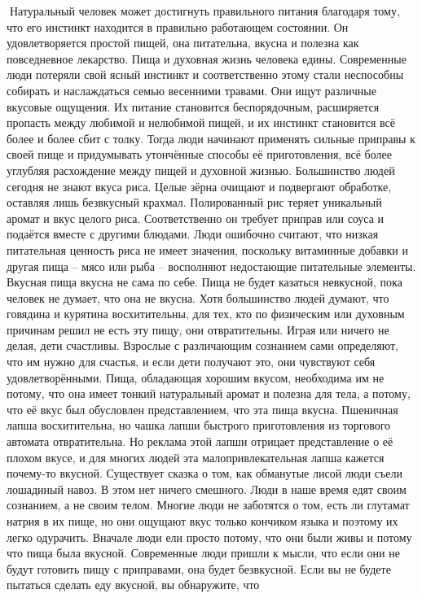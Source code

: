 \documentclass[a4paper]{book}
\begin{document}
Натуральный человек может достигнуть правильного питания благодаря тому, что его
инстинкт находится в правильно работающем состоянии. Он удовлетворяется простой
пищей, она питательна, вкусна и полезна как повседневное лекарство. Пища и духовная
жизнь человека едины.
Современные люди потеряли свой ясный инстинкт и соответственно этому стали
неспособны собирать и наслаждаться семью весенними травами. Они ищут различные
вкусовые ощущения. Их питание становится беспорядочным, расширяется пропасть между
любимой и нелюбимой пищей, и их инстинкт становится всё более и более сбит с толку.
Тогда люди начинают применять сильные приправы к своей пище и придумывать
утончённые способы её приготовления, всё более углубляя расхождение между пищей и
духовной жизнью.
Большинство людей сегодня не знают вкуса риса. Целые зёрна очищают и подвергают
обработке, оставляя лишь безвкусный крахмал. Полированный рис теряет уникальный
аромат и вкус целого риса. Соответственно он требует приправ или соуса и подаётся вместе с
другими блюдами. Люди ошибочно считают, что низкая питательная ценность риса не имеет
значения, поскольку витаминные добавки и другая пища – мясо или рыба – восполняют
недостающие питательные элементы. Вкусная пища вкусна не сама по себе. Пища не будет
казаться невкусной, пока человек не думает, что она не вкусна. Хотя большинство людей
думают, что говядина и курятина восхитительны, для тех, кто по физическим или духовным
причинам решил не есть эту пищу, они отвратительны.
Играя или ничего не делая, дети счастливы. Взрослые с различающим сознанием сами
определяют, что им нужно для счастья, и если дети получают это, они чувствуют себя
удовлетворёнными. Пища, обладающая хорошим вкусом, необходима им не потому, что она
имеет тонкий натуральный аромат и полезна для тела, а потому, что её вкус был обусловлен
представлением, что эта пища вкусна.
Пшеничная лапша восхитительна, но чашка лапши быстрого приготовления из торгового
автомата отвратительна. Но реклама этой лапши отрицает представление о её плохом вкусе,
и для многих людей эта малопривлекательная лапша кажется почему-то вкусной.
Существует сказка о том, как обманутые лисой люди съели лошадиный навоз. В этом
нет ничего смешного. Люди в наше время едят своим сознанием, а не своим телом. Многие
люди не заботятся о том, есть ли глутамат натрия в их пище, но они ощущают вкус только
кончиком языка и поэтому их легко одурачить.
Вначале люди ели просто потому, что они были живы и потому что пища была вкусной.
Современные люди пришли к мысли, что если они не будут готовить пищу с приправами, она
будет безвкусной. Если вы не будете пытаться сделать еду вкусной, вы обнаружите, что
\end{document}
